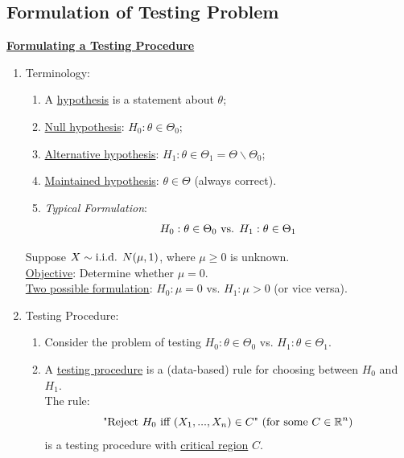 \documentclass[11pt]{elegantbook}
\begin{document}
\subsection{Formulation of Testing Problem}
\textbf{\underline{Formulating a Testing Procedure}}
\begin{enumerate}[$\bullet$]
    \item Terminology:
    \begin{definition}[Hypothesis]
        \normalfont
        \begin{enumerate}
            \item A \underline{hypothesis} is a statement about $\theta$;
            \item \underline{Null hypothesis}: $H_0: \theta\in \Theta_0$;
            \item \underline{Alternative hypothesis}: $H_1: \theta\in \Theta_1=\Theta\backslash\Theta_0$;
            \item \underline{Maintained hypothesis}: $\theta\in \Theta$ (always correct).
            \item \textit{Typical Formulation}: $$H_0: \theta\in \Theta_0 \textnormal{ vs. } H_1: \theta\in \Theta_1$$
        \end{enumerate}
    \end{definition}
    \begin{example}
        Suppose $X\sim \textnormal{i.i.d. } N(\mu,1)$, where $\mu\geq 0$ is unknown.\\
        \underline{Objective}: Determine whether $\mu=0$.\\
        \underline{Two possible formulation}: $H_0:\mu=0$ vs. $H_1:\mu> 0$ (or vice versa).
    \end{example}
    \item Testing Procedure:
    \begin{enumerate}
        \item[] Consider the problem of testing $H_0:\theta\in \Theta_0$ vs. $H_1:\theta\in \Theta_1$.
        \item[]
        \begin{definition}
            \normalfont
            A \underline{testing procedure} is a (data-based) rule for choosing between $H_0$ and $H_1$.\\
            The rule: $$\textnormal{"Reject $H_0$ iff $(X_1,...,X_n)\in C$" (for some $C\in \mathbb{R}^n$)}$$ is a testing procedure with \underline{critical region} $C$.
        \end{definition}

\end{enumerate}
\end{enumerate}
\end{document}
